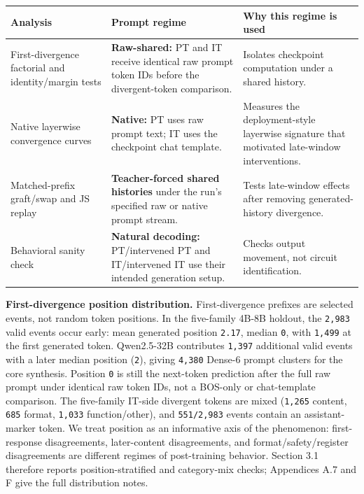 \documentclass[11pt]{article}
\begin{document}
\begin{table}[t]
\centering
\small
\setlength{\tabcolsep}{3pt}
\begin{tabularx}{\linewidth}{@{}>{\raggedright\arraybackslash}X >{\raggedright\arraybackslash}X >{\raggedright\arraybackslash}X@{}}
\toprule
Analysis & Prompt regime & Why this regime is used \\
\midrule
First-divergence factorial and identity/margin tests & \textbf{Raw-shared:} PT and IT receive identical raw prompt token IDs before the divergent-token comparison. & Isolates checkpoint computation under a shared history. \\
Native layerwise convergence curves & \textbf{Native:} PT uses raw prompt text; IT uses the checkpoint chat template. & Measures the deployment-style layerwise signature that motivated late-window interventions. \\
Matched-prefix graft/swap and JS replay & \textbf{Teacher-forced shared histories} under the run's specified raw or native prompt stream. & Tests late-window effects after removing generated-history divergence. \\
Behavioral sanity check & \textbf{Natural decoding:} PT/intervened PT and IT/intervened IT use their intended generation setup. & Checks output movement, not circuit identification. \\
\bottomrule
\end{tabularx}
\end{table}

\textbf{First-divergence position distribution.} First-divergence prefixes are selected events, not random token positions. In the five-family 4B-8B holdout, the \texttt{2,983} valid events occur early: mean generated position \texttt{2.17}, median \texttt{0}, with \texttt{1,499} at the first generated token. Qwen2.5-32B contributes \texttt{1,397} additional valid events with a later median position (\texttt{2}), giving \texttt{4,380} Dense-6 prompt clusters for the core synthesis. Position \texttt{0} is still the next-token prediction after the full raw prompt under identical raw token IDs, not a BOS-only or chat-template comparison. The five-family IT-side divergent tokens are mixed (\texttt{1,265} content, \texttt{685} format, \texttt{1,033} function/other), and \texttt{551/2,983} events contain an assistant-marker token. We treat position as an informative axis of the phenomenon: first-response disagreements, later-content disagreements, and format/safety/register disagreements are different regimes of post-training behavior. Section 3.1 therefore reports position-stratified and category-mix checks; Appendices A.7 and F give the full distribution notes.
\end{document}
